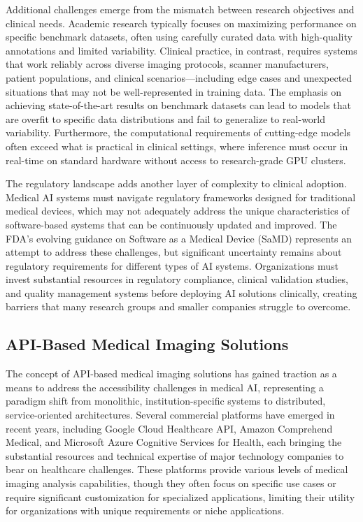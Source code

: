 \documentclass[12pt,a4paper]{article}
\begin{document}
Additional challenges emerge from the mismatch between research objectives and clinical needs. Academic research typically focuses on maximizing performance on specific benchmark datasets, often using carefully curated data with high-quality annotations and limited variability. Clinical practice, in contrast, requires systems that work reliably across diverse imaging protocols, scanner manufacturers, patient populations, and clinical scenarios—including edge cases and unexpected situations that may not be well-represented in training data. The emphasis on achieving state-of-the-art results on benchmark datasets can lead to models that are overfit to specific data distributions and fail to generalize to real-world variability. Furthermore, the computational requirements of cutting-edge models often exceed what is practical in clinical settings, where inference must occur in real-time on standard hardware without access to research-grade GPU clusters.

The regulatory landscape adds another layer of complexity to clinical adoption. Medical AI systems must navigate regulatory frameworks designed for traditional medical devices, which may not adequately address the unique characteristics of software-based systems that can be continuously updated and improved. The FDA's evolving guidance on Software as a Medical Device (SaMD) represents an attempt to address these challenges, but significant uncertainty remains about regulatory requirements for different types of AI systems. Organizations must invest substantial resources in regulatory compliance, clinical validation studies, and quality management systems before deploying AI solutions clinically, creating barriers that many research groups and smaller companies struggle to overcome.

\subsection{API-Based Medical Imaging Solutions}

The concept of API-based medical imaging solutions has gained traction as a means to address the accessibility challenges in medical AI, representing a paradigm shift from monolithic, institution-specific systems to distributed, service-oriented architectures. Several commercial platforms have emerged in recent years, including Google Cloud Healthcare API, Amazon Comprehend Medical, and Microsoft Azure Cognitive Services for Health, each bringing the substantial resources and technical expertise of major technology companies to bear on healthcare challenges. These platforms provide various levels of medical imaging analysis capabilities, though they often focus on specific use cases or require significant customization for specialized applications, limiting their utility for organizations with unique requirements or niche applications.
\end{document}

